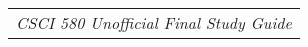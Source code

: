 \documentclass{article}
\begin{document}
	\null\hfill\begin{tabular}[t]{l@{}}
	\textit{CSCI 580 Unofficial Final Study Guide}\\
	\end{tabular} \\ \\
\end{document}
